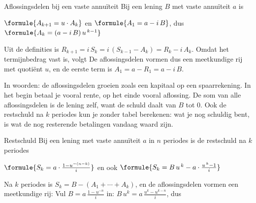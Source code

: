 \begin{theorie}
\begin{stelling}{Aflossingsdelen bij een vaste annuïteit}
Bij een lening $B$ met vaste annuïteit $a$ is

\vspace{1mm}
\qquad $\formule{A_{k+1} = u \cdot A_k}$ \qquad en \qquad $\formule{A_1 = a - i\,B}$, \qquad dus \qquad $\formule{A_k = (a - i\,B)\,u^{\,k-1}}$
\end{stelling}

\begin{bewijs}
Uit de definities is $R_{k+1} = i\,S_k = i\,(S_{k-1} - A_k) = R_k - i\,A_k$. Omdat het termijnbedrag vast is, volgt
De aflossingsdelen vormen dus een meetkundige rij met quotiënt $u$, en de eerste term is $A_1 = a - R_1 = a - i\,B$.
\end{bewijs}
\end{theorie}

In woorden: de aflossingsdelen groeien zoals een kapitaal op een spaarrekening. In het begin betaal je vooral rente, op het einde vooral aflossing. De som van alle aflossingsdelen is de lening zelf, want de schuld daalt van $B$ tot 0. Ook de restschuld na $k$ periodes kun je zonder tabel berekenen: wat je nog schuldig bent, is wat de nog resterende betalingen vandaag waard zijn.

\begin{theorie}
\begin{stelling}{Restschuld}
Bij een lening met vaste annuïteit $a$ in $n$ periodes is de restschuld na $k$ periodes

\vspace{1mm}
\qquad $\formule{S_k = a \cdot \frac{1 - u^{-(n-k)}}{i}}$ \qquad en ook \qquad $\formule{S_k = B\,u^{\,k} - a \cdot \frac{u^{\,k} - 1}{i}}$
\end{stelling}

\begin{bewijs}
Na $k$ periodes is $S_k = B - (A_1 + \cdots + A_k)$, en de aflossingsdelen vormen een meetkundige rij:
Vul $B = a\,\frac{1 - u^{-n}}{i}$ in: $B\,u^k = a\,\frac{u^k - u^{k-n}}{i}$, dus
\end{bewijs}
\end{theorie}

